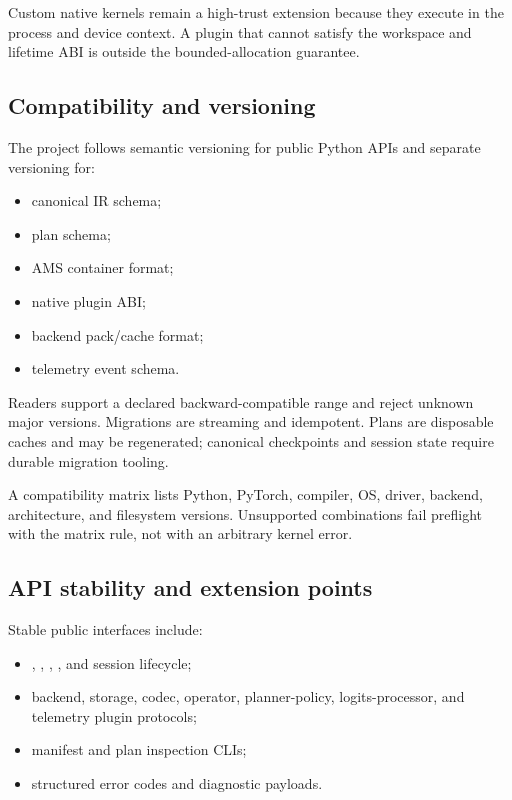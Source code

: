 Custom native kernels remain a high-trust extension because they execute in the process and device context. A plugin that cannot satisfy the workspace and lifetime ABI is outside the bounded-allocation guarantee.

\subsection{Compatibility and versioning}

The project follows semantic versioning for public Python APIs and separate versioning for:

\begin{itemize}
  \item canonical IR schema;
  \item plan schema;
  \item AMS container format;
  \item native plugin ABI;
  \item backend pack/cache format;
  \item telemetry event schema.
\end{itemize}

Readers support a declared backward-compatible range and reject unknown major versions. Migrations are streaming and idempotent. Plans are disposable caches and may be regenerated; canonical checkpoints and session state require durable migration tooling.

A compatibility matrix lists Python, PyTorch, compiler, OS, driver, backend, architecture, and filesystem versions. Unsupported combinations fail preflight with the matrix rule, not with an arbitrary kernel error.

\subsection{API stability and extension points}

Stable public interfaces include:

\begin{itemize}
  \item {}, , , , and session lifecycle;
  \item backend, storage, codec, operator, planner-policy, logits-processor, and telemetry plugin protocols;
  \item manifest and plan inspection CLIs;
  \item structured error codes and diagnostic payloads.
\end{itemize}

